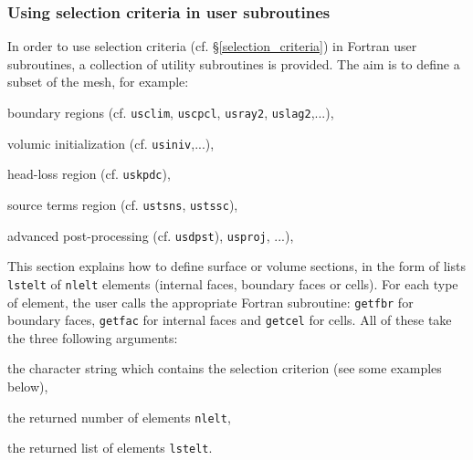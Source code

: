 {{{\subsubsection{Using selection criteria in user subroutines}
\label{fvm_selector}

In order to use selection criteria (cf. \S\ref{selection_criteria}) in Fortran
user subroutines, a collection of utility subroutines is provided. The aim is to
define a subset of the mesh, for example:

\begin{list}{-}{}
\item boundary regions (cf. \texttt{usclim}, \texttt{uscpcl},
\texttt{usray2}, \texttt{uslag2},...),
\item volumic initialization (cf. \texttt{usiniv},...),
\item head-loss region (cf. \texttt{uskpdc}),
\item source terms region (cf. \texttt{ustsns}, \texttt{ustssc}),
\item advanced post-processing (cf. \texttt{usdpst}), \texttt{usproj}, ...),
\end{list}

This section explains how to define surface or volume sections,
in the form of lists \texttt{lstelt} of \texttt{nlelt} elements
(internal faces, boundary faces or cells).
For each type of element, the user calls the appropriate Fortran
subroutine: \texttt{getfbr}
for boundary faces, \texttt{getfac} for internal faces
and \texttt{getcel} for cells. All of these take
the three following arguments:
\begin{list}{-}{}
\item the character string which contains the selection
      criterion (see some examples below), 
\item the returned number of elements \texttt{nlelt}, 
\item the returned list of elements \texttt{lstelt}. 
\end{list}

}}}
